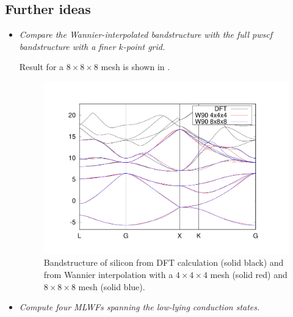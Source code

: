 \subsection*{Further ideas}
\begin{itemize}
	\item {\it Compare the Wannier-interpolated bandstructure with the full pwscf bandstructure with a finer $k$-point grid.}

    Result for a $8\times8\times8$ mesh is shown in .

	\begin{figure}[h!]
	\centering
	\includegraphics[width=0.7\columnwidth]{figure/example11/silicon_bs_DFT_vs_W90_finer_grid.pdf}
	\caption{Bandstructure of silicon from DFT calculation (solid black) and from Wannier interpolation with a $4\times4\times4$ mesh (solid red) and $8\times8\times8$ mesh (solid blue).}\label{fig11.4}
	\end{figure}

	\item {\it Compute four MLWFs spanning the low-lying conduction states.}


\end{itemize}
